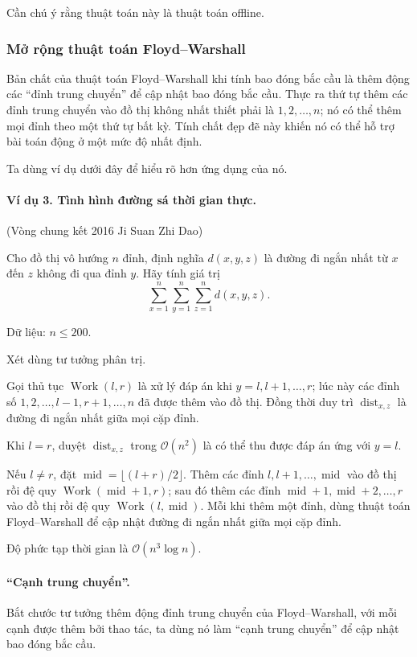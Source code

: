 \documentclass[11pt]{article}
\newcommand{\Oh}{\mathcal{O}}
\begin{document}
Cần chú ý rằng thuật toán này là thuật toán offline.

\subsubsection{Mở rộng thuật toán Floyd--Warshall}

Bản chất của thuật toán Floyd--Warshall khi tính bao đóng bắc cầu là thêm động
các ``đỉnh trung chuyển'' để cập nhật bao đóng bắc cầu. Thực ra thứ tự thêm
các đỉnh trung chuyển vào đồ thị không nhất thiết phải là
\(1,2,\ldots,n\); nó có thể thêm mọi đỉnh theo một thứ tự bất kỳ. Tính chất đẹp
đẽ này khiến nó có thể hỗ trợ bài toán động ở một mức độ nhất định.

Ta dùng ví dụ dưới đây để hiểu rõ hơn ứng dụng của nó.

\paragraph{Ví dụ 3. Tình hình đường sá thời gian thực.}
(Vòng chung kết 2016 Ji Suan Zhi Dao)

Cho đồ thị vô hướng \(n\) đỉnh, định nghĩa \(d(x,y,z)\) là đường đi ngắn nhất
từ \(x\) đến \(z\) không đi qua đỉnh \(y\). Hãy tính giá trị
\[
  \sum_{x=1}^{n}\sum_{y=1}^{n}\sum_{z=1}^{n} d(x,y,z).
\]

Dữ liệu: \(n\le 200\).

Xét dùng tư tưởng phân trị.

Gọi thủ tục \(\operatorname{Work}(l,r)\) là xử lý đáp án khi
\(y=l,l+1,\ldots,r\); lúc này các đỉnh số
\(1,2,\ldots,l-1,r+1,\ldots,n\) đã được thêm vào đồ thị. Đồng thời duy trì
\(\operatorname{dist}_{x,z}\) là đường đi ngắn nhất giữa mọi cặp đỉnh.

Khi \(l=r\), duyệt \(\operatorname{dist}_{x,z}\) trong \(\Oh(n^2)\) là có thể
thu được đáp án ứng với \(y=l\).

Nếu \(l\ne r\), đặt \(\operatorname{mid}=\lfloor(l+r)/2\rfloor\). Thêm các
đỉnh \(l,l+1,\ldots,\operatorname{mid}\) vào đồ thị rồi đệ quy
\(\operatorname{Work}(\operatorname{mid}+1,r)\); sau đó thêm các đỉnh
\(\operatorname{mid}+1,\operatorname{mid}+2,\ldots,r\) vào đồ thị rồi đệ quy
\(\operatorname{Work}(l,\operatorname{mid})\). Mỗi khi thêm một đỉnh, dùng
thuật toán Floyd--Warshall để cập nhật đường đi ngắn nhất giữa mọi cặp đỉnh.

Độ phức tạp thời gian là \(\Oh(n^3\log n)\).

\paragraph{``Cạnh trung chuyển''.}
Bắt chước tư tưởng thêm động đỉnh trung chuyển của Floyd--Warshall, với mỗi
cạnh được thêm bởi thao tác, ta dùng nó làm ``cạnh trung chuyển'' để cập nhật
bao đóng bắc cầu.
\end{document}
